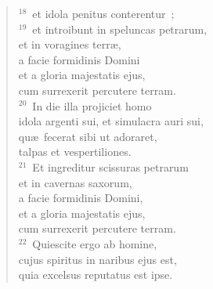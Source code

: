 \begin{verse}
${}^{18}$~et idola penitus conterentur~;\\
${}^{19}$~et introibunt in speluncas petrarum,\\ et in voragines terr\ae ,\\ a facie formidinis Domini\\ et a gloria majestatis ejus,\\ cum surrexerit percutere terram.\\
${}^{20}$~In die illa projiciet homo\\ idola argenti sui, et simulacra auri sui,\\ qu\ae\ fecerat sibi ut adoraret,\\ talpas et vespertiliones.\\
${}^{21}$~Et ingreditur scissuras petrarum\\ et in cavernas saxorum,\\ a facie formidinis Domini,\\ et a gloria majestatis ejus,\\ cum surrexerit percutere terram.\\
${}^{22}$~Quiescite ergo ab homine,\\ cujus spiritus in naribus ejus est,\\ quia excelsus reputatus est ipse.\end{verse}



